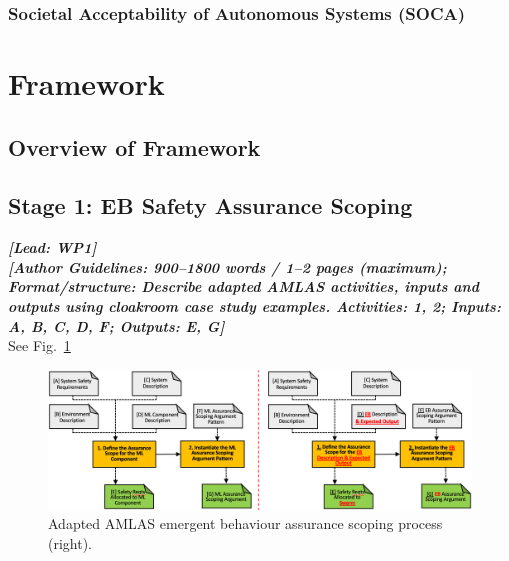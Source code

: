 \documentclass[lettersize,journal]{IEEEtran}
\begin{document}
\subsubsection{Societal Acceptability of Autonomous Systems (SOCA)}
\cite{Porter2022,McDermid2021}

\section{Framework}\label{framework}

\subsection{Overview of Framework} \label{framework-overview}
%
%
\vspace{2mm}

\subsection{Stage 1: EB Safety Assurance Scoping} \label{framework-stage1}
\noindent \textbf{\textit{[Lead:  WP1]}}\\
\noindent\textbf{\textit{[Author Guidelines: 900–1800 words / 1–2 pages (maximum); \\Format/structure: Describe adapted AMLAS activities, inputs and outputs using cloakroom case study examples. Activities: 1, 2; Inputs: A, B, C, D, F; Outputs: E, G]}}\\
See Fig.~\ref{amlas-a-stage1}
\begin{figure}
	\centering
	\includegraphics[width=1.0\textwidth]{figures/amlas-a-stage1.png}
	\caption{Adapted AMLAS emergent behaviour assurance scoping process (right).}
	\label{amlas-a-stage1}
\end{figure}
\end{document}

